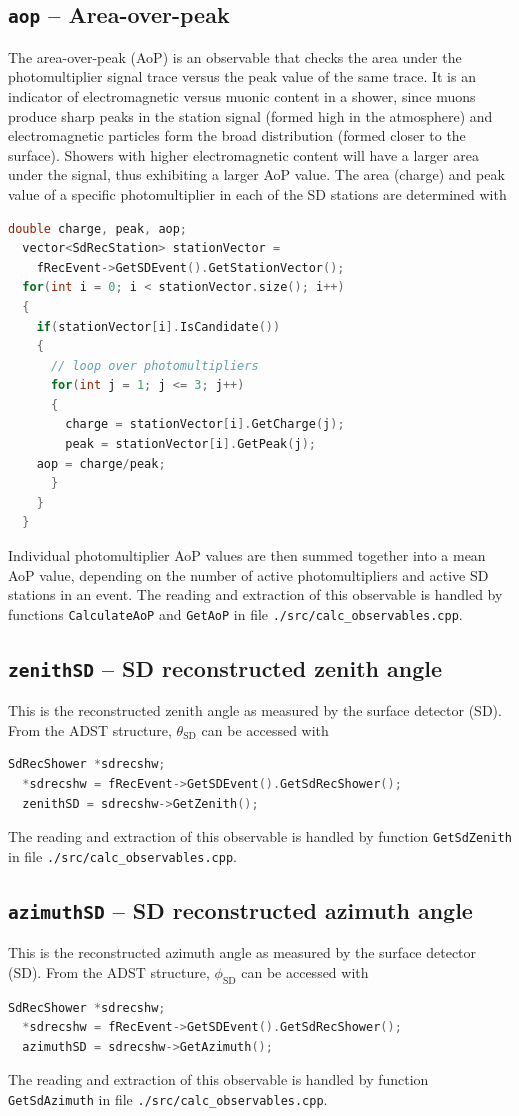 \documentclass[12pt,a4paper]{report}
\begin{document}
\subsection{\texttt{aop} -- Area-over-peak}
The area-over-peak (AoP) is an observable that checks the area under the photomultiplier signal trace versus the peak value of the same trace. It is an indicator of electromagnetic versus muonic content in a shower, since muons produce sharp peaks in the station signal (formed high in the atmosphere) and electromagnetic particles form the broad distribution (formed closer to the surface). Showers with higher electromagnetic content will have a larger area under the signal, thus exhibiting a larger AoP value. The area (charge) and peak value of a specific photomultiplier in each of the SD stations are determined with
\begin{lstlisting}[language=C++]
  double charge, peak, aop;
  vector<SdRecStation> stationVector =
    fRecEvent->GetSDEvent().GetStationVector();
  for(int i = 0; i < stationVector.size(); i++)
  {
    if(stationVector[i].IsCandidate())
    {
      // loop over photomultipliers
      for(int j = 1; j <= 3; j++)
      {
        charge = stationVector[i].GetCharge(j);
        peak = stationVector[i].GetPeak(j);
	aop = charge/peak;
      }
    }
  }
\end{lstlisting}
Individual photomultiplier AoP values are then summed together into a mean AoP value, depending on the number of active photomultipliers and active SD stations in an event. The reading and extraction of this observable is handled by functions \texttt{CalculateAoP} and \texttt{GetAoP} in file \texttt{./src/calc\_observables.cpp}.

\subsection{\texttt{zenithSD} -- SD reconstructed zenith angle}
This is the reconstructed zenith angle as measured by the surface detector (SD). From the ADST structure, $\theta_{\textrm{SD}}$ can be accessed with
\begin{lstlisting}[language=C++]
  SdRecShower *sdrecshw;
  *sdrecshw = fRecEvent->GetSDEvent().GetSdRecShower();
  zenithSD = sdrecshw->GetZenith();
\end{lstlisting}
The reading and extraction of this observable is handled by function \texttt{GetSdZenith} in file \texttt{./src/calc\_observables.cpp}.

\subsection{\texttt{azimuthSD} -- SD reconstructed azimuth angle}
This is the reconstructed azimuth angle as measured by the surface detector (SD). From the ADST structure, $\phi_{\textrm{SD}}$ can be accessed with
\begin{lstlisting}[language=C++]
  SdRecShower *sdrecshw;
  *sdrecshw = fRecEvent->GetSDEvent().GetSdRecShower();
  azimuthSD = sdrecshw->GetAzimuth();
\end{lstlisting}
The reading and extraction of this observable is handled by function \texttt{GetSdAzimuth} in file \texttt{./src/calc\_observables.cpp}.
\end{document}
